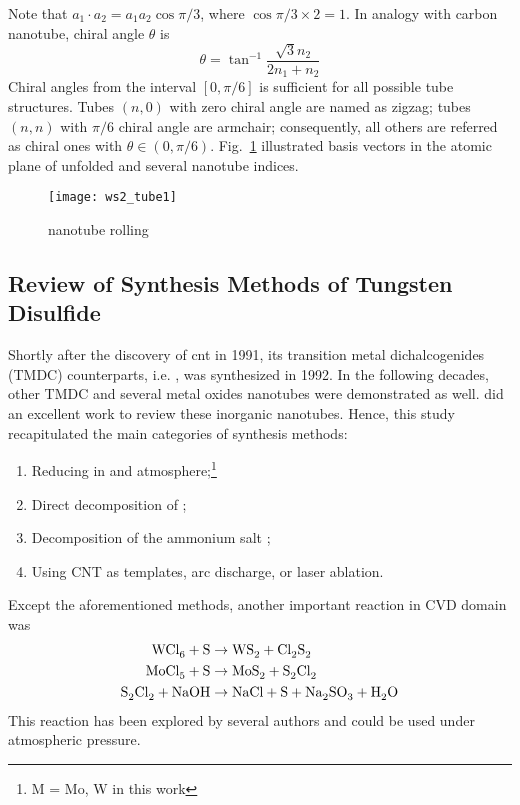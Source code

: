 Note that $a_1 \cdot a_2 = a_1a_2 \cos\pi/3$, where $\cos\pi/3 \times 2 = 1$. In analogy with carbon nanotube, chiral angle $\theta$ is
\begin{equation}
\theta = \tan^{-1}\frac{\sqrt{3}n_2}{2n_1 + n_2}
\end{equation}
Chiral angles from the interval $[0,\pi/6]$ is sufficient for all possible tube structures. Tubes $(n,0)$ with zero chiral angle are named as zigzag; tubes $(n,n)$ with $\pi/6$ chiral angle are armchair; consequently, all others are referred as chiral ones with $\theta \in (0,\pi/6)$. Fig.~\ref{fig:ch5ntroll} illustrated basis vectors in the atomic plane of unfolded  and several nanotube indices.
\begin{figure}[htb]
\centering
\texttt{[image: ws2\_tube1]}
\caption[ nanotube rolling]{ nanotube rolling}
\label{fig:ch5ntroll}
\end{figure}

\subsection{Review of Synthesis Methods of Tungsten Disulfide}
Shortly after the discovery of \gls{cnt} in 1991,\cite{Iijima1991} its transition metal dichalcogenides (TMDC) counterparts, i.e. , was synthesized in 1992.\cite{Tenne1992} In the following decades, other TMDC and several metal oxides nanotubes were demonstrated as well. \citeauthor{Rao2003} did an excellent work to review these inorganic nanotubes.\cite{Rao2003} Hence, this study recapitulated the main categories of synthesis methods:
\begin{enumerate}
\item Reducing  in  and  atmosphere;\footnote{M = Mo, W in this work}
\item Direct decomposition of ;
\item Decomposition of the ammonium salt ;
\item Using CNT as templates, arc discharge, or laser ablation.
\end{enumerate}
Except the aforementioned methods, another important reaction in CVD domain was
\begin{align}
\cee{WCl6 + S &\rightarrow WS2 + Cl2S2}\\
\cee{MoCl5 + S &\rightarrow MoS2 + S2Cl2} \\
\cee{S2Cl2 + NaOH &\rightarrow NaCl + S + Na2SO3 + H2O}
\end{align}
This reaction has been explored by several authors\cite{Stoffels1999} and could be used under atmospheric pressure.\cite{Li2004a}

